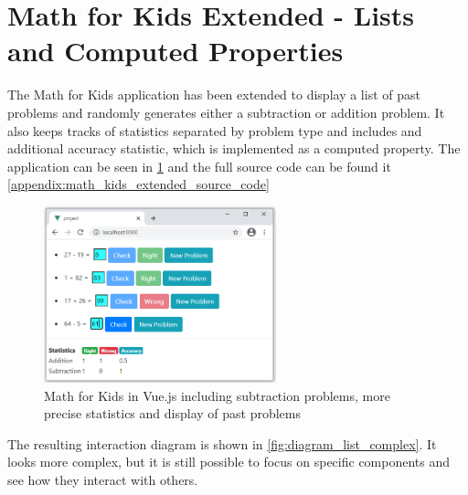 \section{Math for Kids Extended - Lists and Computed Properties}
The Math for Kids application has been extended to display a list of past problems and randomly generates either a subtraction or addition problem. It also keeps tracks of statistics separated by problem type and includes and additional accuracy statistic, which is implemented as a computed property. The application can be seen in \ref{fig:eval_image_list_complex} and the full source code can be found it \ref{appendix:math_kids_extended_source_code}
\begin{figure}[H]
    \centering
    \includegraphics[width=0.6\textwidth]{images/math_for_kids_own_complex.png}
     \caption{Math for Kids in Vue.js including subtraction problems, more precise statistics and display of past problems }
     \label{fig:eval_image_list_complex}
\end{figure}

The resulting interaction diagram  is shown in \ref{fig:diagram_list_complex}. It looks more complex, but it is still possible to focus on specific components and see how they interact with others. 

